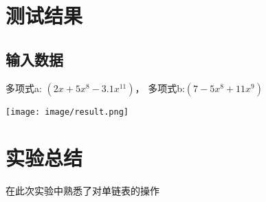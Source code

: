 \documentclass[10pt, a4paper, oneside]{ctexart}
\begin{document}
\section{测试结果}
\subsection{输入数据}
多项式a: $\left(2 x+5 x^8-3.1 x^{11}\right)$， 多项式b:$\left(7-5 x^8+11 x^9\right)$
\begin{figure*}[htbp]
	\centering
	\texttt{[image: image/result.png]}
\end{figure*}

\section{实验总结}
在此次实验中熟悉了对单链表的操作
\end{document}
